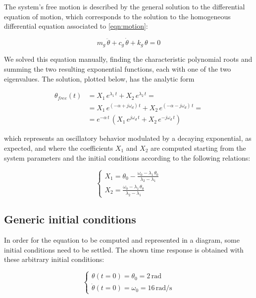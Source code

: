 \documentclass[a4paper,12pt,oneside]{article}
\begin{document}
The system's free motion is described by the general solution to the differential equation of motion, which corresponds to the solution to the homogeneous differential equation associated to \eqref{eqn:motion}:

\[ m_g \, \ddot{\theta} + c_g \, \dot{\theta} + k_g \, \theta = 0 \]

We solved this equation manually, finding the characteristic polynomial roots and summing the two resulting exponential functions, each with one of the two eigenvalues. The solution, plotted below, has the analytic form

\[ \begin{split}
	\theta_{free}(t) & = X_1 \, e^{\lambda_1 \, t} + X_2 \, e^{\lambda_2 \, t} = \\
									 & = X_1 \, e^{(-\alpha + j \omega_d) \, t} + %
									 	X_2 \, e^{(-\alpha - j \omega_d) \, t} = \\
									 & = e^{-\alpha \, t} \, %
										(X_1 \, e^{j \omega_d \, t} + X_2 \, e^{- j \omega_d \, t})
\end{split} \]

which represents an oscillatory behavior modulated by a decaying exponential, as expected, and where the coefficients $ X_1 $ and $ X_2 $ are computed starting from the system parameters and the initial conditions according to the following relations:

\[ \begin{cases}
	X_1 = \theta_0 - \frac{\omega_0 - \lambda_1 \, \theta_0} %
		{\lambda_2 - \lambda_1} \\
	X_2 = \frac{\omega_0 - \lambda_1 \, \theta_0} %
		{\lambda_2 - \lambda_1}
\end{cases} \]

\subsection{Generic initial conditions}
\label{subs:generic_initial_conditions}

In order for the equation to be computed and represented in a diagram, some initial conditions need to be settled. The shown time response is obtained with these arbitrary initial conditions:

\[ \begin{cases}
	\theta(t=0) = \theta_0 = 2 \, \text{rad} \\
	\dot{\theta}(t=0) = \omega_0 = 16 \, \text{rad/s}
\end{cases} \]
\end{document}
